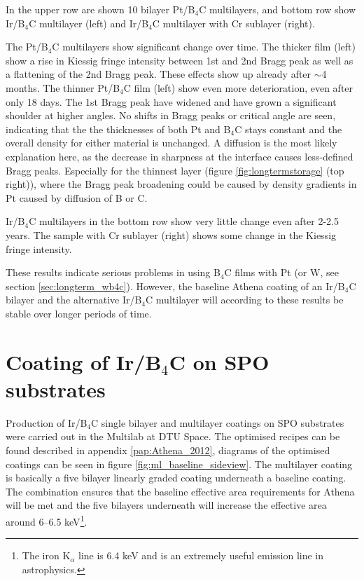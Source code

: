In the upper row are shown 10 bilayer Pt/B$_4$C multilayers, and bottom row show Ir/B$_4$C multilayer (left) and Ir/B$_4$C multilayer with Cr sublayer (right).

The Pt/B$_4$C multilayers show significant change over time. The thicker film (left) show a rise in Kiessig fringe intensity between 1st and 2nd Bragg peak as well as a flattening of the 2nd Bragg peak. These effects show up already after $\sim$4 months. The thinner Pt/B$_4$C film (left) show even more deterioration, even after only 18 days. The 1st Bragg peak have widened and have grown a significant shoulder at higher angles. No shifts in Bragg peaks or critical angle are seen, indicating that the the thicknesses of both Pt and B$_4$C stays constant and the overall density for either material is unchanged. A diffusion is the most likely explanation here, as the decrease in sharpness at the interface causes less-defined Bragg peaks. Especially for the thinnest layer (figure \ref{fig:longtermstorage} (top right)), where the Bragg peak broadening could be caused by density gradients in Pt caused by diffusion of B or C.

Ir/B$_4$C multilayers in the bottom row show very little change even after 2-2.5 years. The sample with Cr sublayer (right) shows some change in the Kiessig fringe intensity.

These results indicate serious problems in using B$_4$C films with Pt (or W, see section \ref{sec:longterm_wb4c}). However, the baseline Athena coating of an Ir/B$_4$C bilayer and the alternative Ir/B$_4$C multilayer will according to these results be stable over longer periods of time.

\section{Coating of Ir/B$_4$C on SPO substrates}
Production of Ir/B$_4$C single bilayer and multilayer coatings on SPO substrates were carried out in the Multilab at DTU Space. The optimised recipes can be found described in appendix \ref{pap:Athena_2012}, diagrams of the optimised coatings can be seen in figure \ref{fig:ml_baseline_sideview}. The multilayer coating is basically a five bilayer linearly graded coating underneath a baseline coating. The combination ensures that the baseline effective area requirements for Athena will be met and the five bilayers underneath will increase the effective area around 6--6.5 keV\footnote{The iron K$_{\alpha}$ line is 6.4 keV and is an extremely useful emission line in astrophysics.}.

